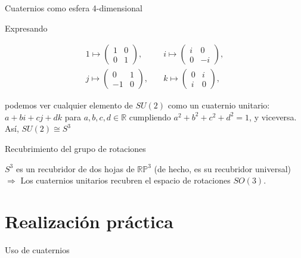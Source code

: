\documentclass[,ignorenonframetext,compress]{beamer}
\begin{document}
\begin{frame}{Cuaternios como esfera 4-dimensional}

Expresando

\begin{align*}
  1 \mapsto \begin{pmatrix} 1 & 0 \\ 0 & 1 \end{pmatrix},&\quad
  i \mapsto \begin{pmatrix} i & 0 \\ 0 &-i \end{pmatrix},\\
  j \mapsto \begin{pmatrix} 0 & 1 \\-1 & 0 \end{pmatrix},&\quad
  k \mapsto \begin{pmatrix} 0 & i \\ i & 0 \end{pmatrix},
\end{align*}

podemos ver cualquier elemento de \(SU(2)\) como un cuaternio unitario:
\(a + bi + cj + dk\) para \(a,b,c,d \in \mathbb{R}\) cumpliendo
\(a^2+b^2+c^2+d^2 = 1\), y viceversa. Así, \(SU(2)\cong S^3\)

\end{frame}

\begin{frame}{Recubrimiento del grupo de rotaciones}

\(S^3\) es un recubridor de dos hojas de \(\mathbb{RP}^3\) (de hecho, es
su recubridor universal) \(\Rightarrow\) Los cuaternios unitarios
recubren el espacio de rotaciones \(SO(3)\).

\end{frame}

\section{Realización práctica}\label{realizaciuxf3n-pruxe1ctica}

\begin{frame}{Uso de cuaternios}

\end{frame}
\end{document}
